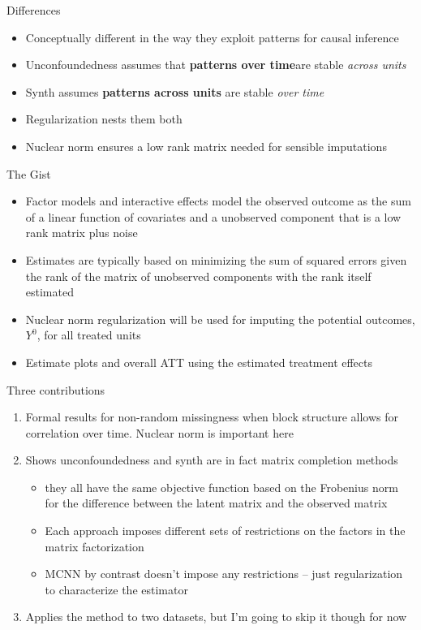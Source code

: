\documentclass{beamer}
\begin{document}
\begin{frame}{Differences}

\begin{itemize}
\item Conceptually different in the way they exploit patterns for causal inference
\item Unconfoundedness assumes that \textbf{patterns over time}are stable \emph{across units}
\item Synth assumes \textbf{patterns across units} are stable \emph{over time}
\item Regularization nests them both
\item Nuclear norm ensures a low rank matrix needed for sensible imputations

\end{itemize}

\end{frame}

\begin{frame}{The Gist}

\begin{itemize}
\item Factor models and interactive effects model the observed outcome as the sum of a linear function of covariates and a unobserved component that is a low rank matrix plus noise
\item Estimates are typically based on minimizing the sum of squared errors given the rank of the matrix of unobserved components with the rank itself estimated
\item Nuclear norm regularization will be used for imputing the potential outcomes, $Y^0$, for all treated units
\item Estimate plots and overall ATT using the estimated treatment effects
\end{itemize}

\end{frame}

\begin{frame}{Three contributions}

\begin{enumerate}
\item Formal results for non-random missingness when block structure allows for correlation over time.  Nuclear norm is important here
\item Shows unconfoundedness and synth are in fact matrix completion methods 
	\begin{itemize} 
	\item they all have the same objective function based on the Frobenius norm for the difference between the latent matrix and the observed matrix
	\item Each approach imposes different sets of restrictions on the factors in the matrix factorization
	\item MCNN by contrast doesn't impose any restrictions -- just regularization to characterize the estimator
	\end{itemize}
\item Applies the method to two datasets, but I'm going to skip it though for now
\end{enumerate}

\end{frame}
\end{document}
